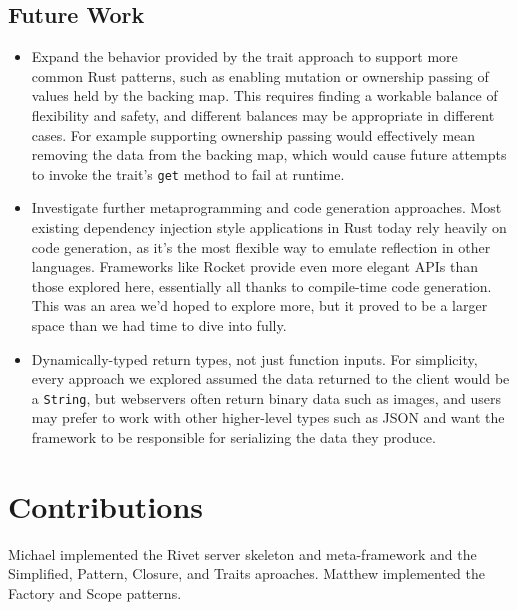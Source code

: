 \documentclass[sigconf]{acmart}
\def\code#1{\lstinline{#1}}
\begin{document}
\subsection{Future Work}

\begin{itemize}
\item Expand the behavior provided by the trait approach to support more common Rust patterns, such as enabling mutation or ownership passing of values held by the backing map. This requires finding a workable balance of flexibility and safety, and different balances may be appropriate in different cases. For example supporting ownership passing would effectively mean removing the data from the backing map, which would cause future attempts to invoke the trait's \code{get} method to fail at runtime.
\item Investigate further metaprogramming and code generation approaches. Most existing dependency injection style applications in Rust today rely heavily on code generation, as it's the most flexible way to emulate reflection in other languages. Frameworks like Rocket provide even more elegant APIs than those explored here, essentially all thanks to compile-time code generation. This was an area we'd hoped to explore more, but it proved to be a larger space than we had time to dive into fully.
\item Dynamically-typed return types, not just function inputs. For simplicity, every approach we explored assumed the data returned to the client would be a \code{String}, but webservers often return binary data such as images, and users may prefer to work with other higher-level types such as JSON and want the framework to be responsible for serializing the data they produce.
\end{itemize}

\section{Contributions}
Michael implemented the Rivet server skeleton and meta-framework and the Simplified, Pattern, Closure, and Traits aproaches. Matthew implemented the Factory and Scope patterns.



\end{document}

